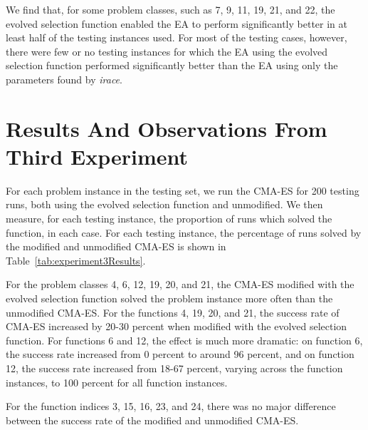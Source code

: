 \documentclass[times,12pt,titlepage]{mstogs}
\begin{document}
\begin{ThesisBody}
\begin{table}[h]
\begin{tabular}{c|c}
  \bottomrule
\end{tabular}
\end{table}
\FloatBarrier

We find that, for some problem classes, such as 7, 9, 11, 19, 21, and 22, the evolved selection function enabled the EA to perform significantly better in at least half of the testing instances used. For most of the testing cases, however, there were few or no testing instances for which the EA using the evolved selection function performed significantly better than the EA using only the parameters found by \textit{irace}. 

\section{Results And Observations From Third Experiment}
\label{thirdExperimentResults}

For each problem instance in the testing set, we run the CMA-ES for 200 testing runs, both using the evolved selection function and unmodified. We then measure, for each testing instance, the proportion of runs which solved the function, in each case. For each testing instance, the percentage of runs solved by the modified and unmodified CMA-ES is shown in Table~\ref{tab:experiment3Results}.

For the problem classes 4, 6, 12, 19, 20, and 21, the CMA-ES modified with the evolved selection function solved the problem instance more often than the unmodified CMA-ES. For the functions 4, 19, 20, and 21, the success rate of CMA-ES increased by 20-30 percent when modified with the evolved selection function. For functions 6 and 12, the effect is much more dramatic: on function 6, the success rate increased from 0 percent to around 96 percent, and on function 12, the success rate increased from 18-67 percent, varying across the function instances, to 100 percent for all function instances.

For the function indices 3, 15, 16, 23, and 24, there was no major difference between the success rate of the modified and unmodified CMA-ES.


\end{ThesisBody}
\end{document}
